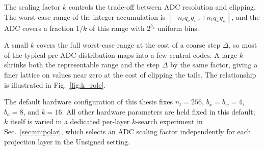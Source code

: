 \documentclass[a4paper,11pt,oneside]{article}
\theoremstyle{breakstyle}
\begin{document}
The scaling factor $k$ controls the trade-off between ADC resolution
and clipping. The worst-case range of the integer accumulation is
$[-n_t q_x q_w, +n_t q_x q_w]$, and the ADC covers a fraction $1/k$
of this range with $2^{b_a}$ uniform bins.

A small $k$ covers the full worst-case range at the cost of a coarse
step $\Delta$, so most of the typical pre-ADC distribution maps into a
few central codes. A large $k$ shrinks both the representable range
and the step $\Delta$ by the same factor, giving a finer lattice on
values near zero at the cost of clipping the tails. The relationship
is illustrated in Fig.~\ref{fig:k_role}.

The default hardware configuration of this thesis fixes
$n_t = 256$, $b_x = b_w = 4$, $b_a = 8$, and $k = 16$. All other hardware parameters are held fixed in this default; $k$
itself is varied in a dedicated per-layer $k$-search experiment in
Sec.~\ref{sec:unipolar}, which selects an ADC scaling factor
independently for each projection layer in the Unsigned setting.
\end{document}
